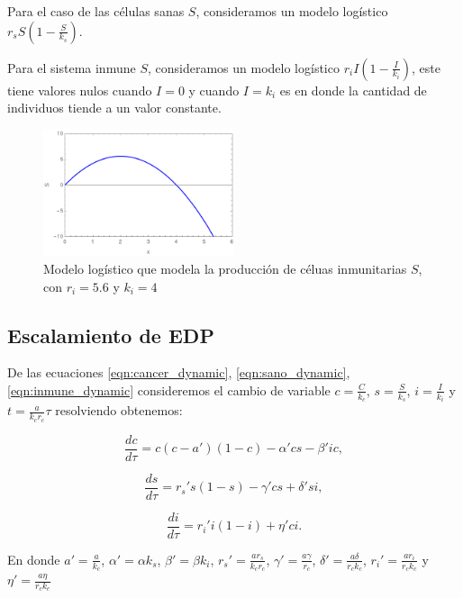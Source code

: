 \documentclass{article}
\begin{document}
Para el caso de las células sanas $S$, consideramos un modelo logístico $r_s S (1 - \frac{S}{k_s})$. 

Para el sistema inmune $S$, consideramos un modelo logístico $r_i I(1-\frac{I}{k_i})$, este tiene valores nulos cuando $I=0$ y cuando $I=k_i$ es en donde la cantidad de individuos tiende a un valor constante.

\begin{figure}[ht]
    \centering
    \includegraphics[width=0.5\textwidth]{images/logistic.png}
    \caption{Modelo logístico que modela la producción de céluas inmunitarias $S$, con $r_i=5.6 $ y $k_i=4$}
    \label{fig:logistic}
\end{figure}

\subsection{Escalamiento de EDP}
De las ecuaciones \ref{eqn:cancer_dynamic}, \ref{eqn:sano_dynamic}, \ref{eqn:inmune_dynamic} consideremos el cambio de variable $c=\frac{C}{k_c}$,  $s=\frac{S}{k_s}$, $i=\frac{I}{k_i}$ y $t = \frac{a}{k_c r_c} \tau $ resolviendo obtenemos:

\begin{equation}
    \frac{dc}{d \tau} =  c (c - a')(1-c) - \alpha' cs - \beta' i c,
    \label{eqn:cancer_dynamic_escalado}
\end{equation}

\begin{equation}
    \frac{ds}{d \tau} = r_s ' s (1 - s)  - \gamma' cs + \delta' si,
    \label{eqn:sano_dynamic_escalado}
\end{equation}


\begin{equation}
    \frac{di}{d\tau} = r_i ' i(1-i) + \eta' ci.
    \label{eqn:inmune_dynamic_escalado}
\end{equation}

En donde $a' = \frac{a}{k_c}$, $\alpha'= \alpha k_s$, $\beta'=\beta k_i$, $r_s'= \frac{a r_s}{k_c r_c}$, $\gamma'=\frac{a \gamma}{r_c}$, $\delta' = \frac{a \delta}{r_c k_c}$, $r_i' = \frac{a r_i}{r_c k_c}$ y $\eta' = \frac{a \eta}{r_c k_c}$
\end{document}
